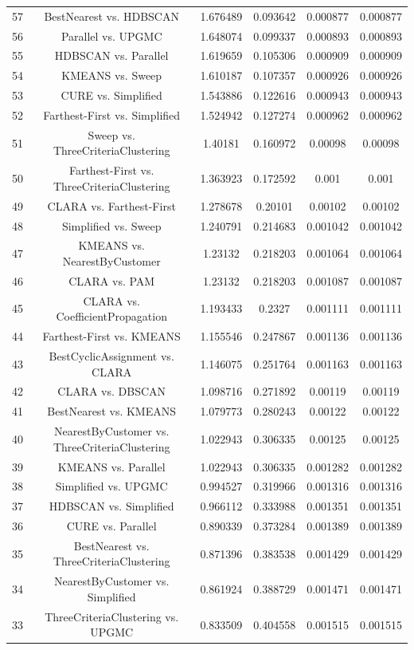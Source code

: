 \documentclass[a4paper,10pt]{article}
\begin{document}
\begin{landscape}
\begin{table}[!htp]
\begin{tabular}{cccccc}
57&BestNearest vs. HDBSCAN&1.676489&0.093642&0.000877&0.000877\\
56&Parallel vs. UPGMC&1.648074&0.099337&0.000893&0.000893\\
55&HDBSCAN vs. Parallel&1.619659&0.105306&0.000909&0.000909\\
54&KMEANS vs. Sweep&1.610187&0.107357&0.000926&0.000926\\
53&CURE vs. Simplified&1.543886&0.122616&0.000943&0.000943\\
52&Farthest-First vs. Simplified&1.524942&0.127274&0.000962&0.000962\\
51&Sweep vs. ThreeCriteriaClustering&1.40181&0.160972&0.00098&0.00098\\
50&Farthest-First vs. ThreeCriteriaClustering&1.363923&0.172592&0.001&0.001\\
49&CLARA vs. Farthest-First&1.278678&0.20101&0.00102&0.00102\\
48&Simplified vs. Sweep&1.240791&0.214683&0.001042&0.001042\\
47&KMEANS vs. NearestByCustomer&1.23132&0.218203&0.001064&0.001064\\
46&CLARA vs. PAM&1.23132&0.218203&0.001087&0.001087\\
45&CLARA vs. CoefficientPropagation&1.193433&0.2327&0.001111&0.001111\\
44&Farthest-First vs. KMEANS&1.155546&0.247867&0.001136&0.001136\\
43&BestCyclicAssignment vs. CLARA&1.146075&0.251764&0.001163&0.001163\\
42&CLARA vs. DBSCAN&1.098716&0.271892&0.00119&0.00119\\
41&BestNearest vs. KMEANS&1.079773&0.280243&0.00122&0.00122\\
40&NearestByCustomer vs. ThreeCriteriaClustering&1.022943&0.306335&0.00125&0.00125\\
39&KMEANS vs. Parallel&1.022943&0.306335&0.001282&0.001282\\
38&Simplified vs. UPGMC&0.994527&0.319966&0.001316&0.001316\\
37&HDBSCAN vs. Simplified&0.966112&0.333988&0.001351&0.001351\\
36&CURE vs. Parallel&0.890339&0.373284&0.001389&0.001389\\
35&BestNearest vs. ThreeCriteriaClustering&0.871396&0.383538&0.001429&0.001429\\
34&NearestByCustomer vs. Simplified&0.861924&0.388729&0.001471&0.001471\\
33&ThreeCriteriaClustering vs. UPGMC&0.833509&0.404558&0.001515&0.001515\\

\end{tabular}
\end{table}
\end{landscape}
\end{document}
